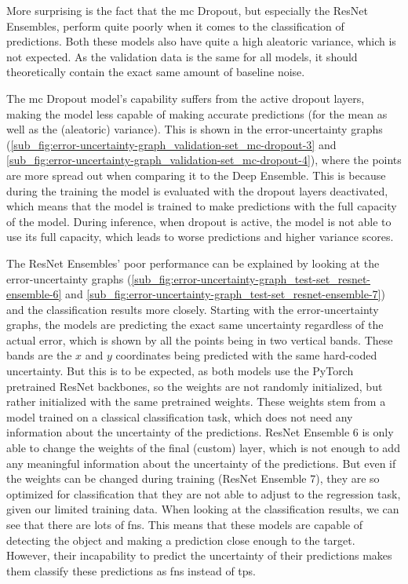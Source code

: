More surprising is the fact that the \gls{mc} Dropout, but especially the ResNet Ensembles, perform quite poorly when it comes to the classification of predictions. 
Both these models also have quite a high aleatoric variance, which is not expected. 
As the validation data is the same for all models, it should theoretically contain the exact same amount of baseline noise.

The \gls{mc} Dropout model's capability suffers from the active dropout layers, making the model less capable of making accurate predictions (for the mean as well as the (aleatoric) variance).
This is shown in the error-uncertainty graphs (\cref{sub_fig:error-uncertainty-graph_validation-set_mc-dropout-3} and \cref{sub_fig:error-uncertainty-graph_validation-set_mc-dropout-4}), where the points are more spread out when comparing it to the Deep Ensemble. 
This is because during the training the model is evaluated with the dropout layers deactivated, which means that the model is trained to make predictions with the full capacity of the model.
During inference, when dropout is active, the model is not able to use its full capacity, which leads to worse predictions and higher variance scores.

The ResNet Ensembles' poor performance can be explained by looking at the error-uncertainty graphs (\cref{sub_fig:error-uncertainty-graph_test-set_resnet-ensemble-6} and \cref{sub_fig:error-uncertainty-graph_test-set_resnet-ensemble-7}) and the classification results more closely.
Starting with the error-uncertainty graphs, the models are predicting the exact same uncertainty regardless of the actual error, which is shown by all the points being in two vertical bands.
These bands are the $x$ and $y$ coordinates being predicted with the same hard-coded uncertainty.
But this is to be expected, as both models use the PyTorch~\cite{src:pytorch} pretrained ResNet backbones, so the weights are not randomly initialized, but rather initialized with the same pretrained weights.
These weights stem from a model trained on a classical classification task, which does not need any information about the uncertainty of the predictions.
ResNet Ensemble 6 is only able to change the weights of the final (custom) layer, which is not enough to add any meaningful information about the uncertainty of the predictions.
But even if the weights can be changed during training (ResNet Ensemble 7), they are so optimized for classification that they are not able to adjust to the regression task, given our limited training data.
When looking at the classification results, we can see that there are lots of \glspl{fn}. This means that these models are capable of detecting the object and making a prediction close enough to the target.
However, their incapability to predict the uncertainty of their predictions makes them classify these predictions as \glspl{fn} instead of \glspl{tp}.

